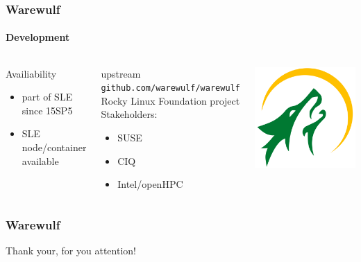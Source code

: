 \documentclass[aspectratio=169]{beamer}
\begin{document}
\begin{frame}[fragile]
\frametitle{Warewulf}
\framesubtitle{Development}
\begin{columns}
\begin{block}{Availiability}
  \begin{itemize}
    \item part of SLE since 15SP5
    \item SLE node/container available
  \end{itemize}
\end{block}
\begin{block}{upstream}
\texttt{github.com/warewulf/warewulf} \\
Rocky Linux Foundation project\\
Stakeholders:
\begin{itemize}
  \item SUSE
  \item CIQ
  \item Intel/openHPC
\end{itemize}
\end{block}
\includegraphics[width=.8\linewidth]{warewulf-logo}
\end{columns}
\end{frame}
\begin{frame}[fragile]
\frametitle{Warewulf}
Thank your, for you attention!
\end{frame}
\end{document}
